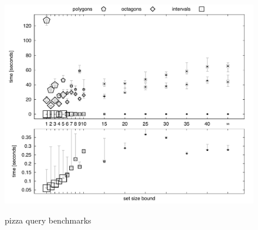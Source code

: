 %

\begin{figure}[t!]
\scriptsize
\centering
\includegraphics[width=12.5cm]{figures/plot_domains_pizza.pdf} \\
\caption{pizza query benchmarks}
\label{fig:bench_domains_pizza}
\end{figure}

